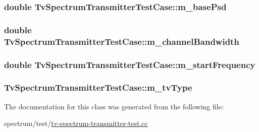 \subsubsection[{\texorpdfstring{m\+\_\+base\+Psd}{m_basePsd}}]{\setlength{\rightskip}{0pt plus 5cm}double Tv\+Spectrum\+Transmitter\+Test\+Case\+::m\+\_\+base\+Psd\hspace{0.3cm}{\ttfamily [private]}}\hypertarget{classTvSpectrumTransmitterTestCase_a82db7da50d4e5f4087fa2dbf39d51582}{}\label{classTvSpectrumTransmitterTestCase_a82db7da50d4e5f4087fa2dbf39d51582}
\subsubsection[{\texorpdfstring{m\+\_\+channel\+Bandwidth}{m_channelBandwidth}}]{\setlength{\rightskip}{0pt plus 5cm}double Tv\+Spectrum\+Transmitter\+Test\+Case\+::m\+\_\+channel\+Bandwidth\hspace{0.3cm}{\ttfamily [private]}}\hypertarget{classTvSpectrumTransmitterTestCase_aeddf6b4a780ae52950c5f35ed50f3f94}{}\label{classTvSpectrumTransmitterTestCase_aeddf6b4a780ae52950c5f35ed50f3f94}
\subsubsection[{\texorpdfstring{m\+\_\+start\+Frequency}{m_startFrequency}}]{\setlength{\rightskip}{0pt plus 5cm}double Tv\+Spectrum\+Transmitter\+Test\+Case\+::m\+\_\+start\+Frequency\hspace{0.3cm}{\ttfamily [private]}}\hypertarget{classTvSpectrumTransmitterTestCase_a2d6f826c11ed04d0b321853c18dd0092}{}\label{classTvSpectrumTransmitterTestCase_a2d6f826c11ed04d0b321853c18dd0092}
\subsubsection[{\texorpdfstring{m\+\_\+tv\+Type}{m_tvType}}]{ Tv\+Spectrum\+Transmitter\+Test\+Case\+::m\+\_\+tv\+Type\hspace{0.3cm}{\ttfamily [private]}}\hypertarget{classTvSpectrumTransmitterTestCase_a4f6d92198a3de6b3666f36b8692575f7}{}\label{classTvSpectrumTransmitterTestCase_a4f6d92198a3de6b3666f36b8692575f7}


The documentation for this class was generated from the following file\+:\begin{DoxyCompactItemize}
\item 
spectrum/test/\hyperlink{tv-spectrum-transmitter-test_8cc}{tv-\/spectrum-\/transmitter-\/test.\+cc}\end{DoxyCompactItemize}

